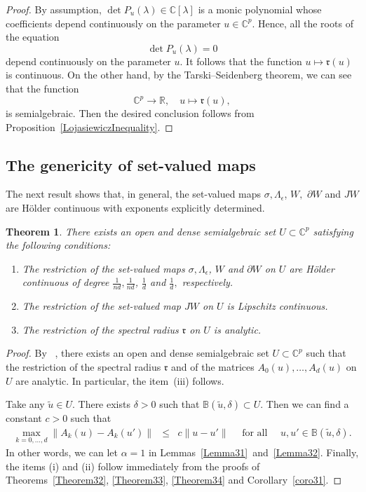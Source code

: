 \documentclass[10pt,reqno]{amsart}
\theoremstyle{break-italic}
\theoremstyle{break-italic}
\theoremstyle{break-italic}
\theoremstyle{break-italic}
\theoremstyle{break-italic}
\theoremstyle{break-italic}
\theoremstyle{break-italic}
\theoremstyle{break-italic}
\newtheorem{theorem}[satz]{Theorem}
\theoremstyle{break-roman}
\theoremstyle{standard}
\theoremstyle{varthm-roman}
\theoremstyle{varthm-italic}
\theoremstyle{varthm-roman-break}
\theoremstyle{varthm-italic-break}
\theoremstyle{varthm-roman-no-punctuation}
\theoremstyle{varthm-italic-no-punctuation}
\numberwithin{equation}{section}
\begin{document}
\begin{proof}
By assumption, $\det P_u(\lambda) \in \mathbb{C}[\lambda]$ is a monic polynomial whose coefficients depend continuously on the parameter $u \in \mathbb{C}^p.$
Hence, all the roots of the equation
$$\det P_u(\lambda) = 0$$
depend continuously on the parameter $u.$ It follows that the function $u \mapsto \mathfrak{r}(u)$ is continuous. On the other hand, by the Tarski--Seidenberg theorem, we can see that the function $$\mathbb{C}^p \to \mathbb{R}, \quad u \mapsto \mathfrak{r}(u),$$
is semialgebraic. Then the desired conclusion follows from Proposition~\ref{LojasiewiczInequality}.
\end{proof}

\subsection{The genericity of set-valued maps}

The next result shows that, in general, the set-valued maps $\sigma, \Lambda_{\epsilon}$, $W,$ $\partial W$ and  $JW$ are H\"older continuous with exponents explicitly determined.

\begin{theorem}\label{Theorem41}
There exists an open and dense semialgebraic set $U \subset \mathbb{C}^p$ satisfying the following conditions:

\begin{enumerate}
\item[(i)]  The restriction of the set-valued maps $\sigma, \Lambda_{\epsilon}$, $W$ and $\partial W$ on $U$ are H\"older continuous of degree $\frac{1}{nd}, \frac{1}{nd}$, $\frac{1}{d}$ and $\frac{1}{d},$ respectively.

\item[(ii)] The restriction of the set-valued map $JW$ on $U$ is Lipschitz continuous.

\item[(iii)] The restriction of the spectral radius $\mathfrak{r}$ on $U$ is analytic.
\end{enumerate}


\end{theorem}

\begin{proof}
By ~\cite[Theorem~1.7]{HP2017}, there exists an open and dense semialgebraic set $U \subset \mathbb{C}^p$ such that the restriction
of the spectral radius $\mathfrak{r}$ and of the matrices $A_0(u), \ldots, A_{d}(u)$ on $U$ are analytic.
In particular, the item~(iii) follows.

Take any $\tilde{u} \in U.$ There exists $\delta > 0$ such that $\mathbb{B}(\tilde{u}, \delta) \subset U.$ Then we can find a constant $c > 0$ such that
\begin{eqnarray*}
\max_{k = 0, \ldots, d} \|A_k(u) - A_k(u')\| & \le & c \|u - u'\| \quad \textrm{ for all } \quad u, u' \in \mathbb{B}(\tilde{u}, \delta).
\end{eqnarray*}
In other words, we can let $\alpha = 1$ in Lemmas~\ref{Lemma31}~and~\ref{Lemma32}.
Finally, the items (i) and (ii) follow immediately from the proofs of Theorems~\ref{Theorem32}, \ref{Theorem33}, \ref{Theorem34} and
Corollary~\ref{coro31}.
\end{proof}
\end{document}
